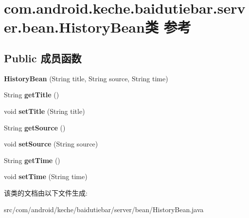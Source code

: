 \hypertarget{classcom_1_1android_1_1keche_1_1baidutiebar_1_1server_1_1bean_1_1_history_bean}{}\section{com.\+android.\+keche.\+baidutiebar.\+server.\+bean.\+History\+Bean类 参考}
\label{classcom_1_1android_1_1keche_1_1baidutiebar_1_1server_1_1bean_1_1_history_bean}
\subsection*{Public 成员函数}
\begin{DoxyCompactItemize}
\item 
\mbox{\label{classcom_1_1android_1_1keche_1_1baidutiebar_1_1server_1_1bean_1_1_history_bean_a3e26dd4e6369e2564de4675a1a8baa4d}} 
{\bfseries History\+Bean} (String title, String source, String time)
\item 
\mbox{\label{classcom_1_1android_1_1keche_1_1baidutiebar_1_1server_1_1bean_1_1_history_bean_a4c53786442e14dffef3c29269289b44f}} 
String {\bfseries get\+Title} ()
\item 
\mbox{\label{classcom_1_1android_1_1keche_1_1baidutiebar_1_1server_1_1bean_1_1_history_bean_a710912318668039881c80cdee9dd4b5c}} 
void {\bfseries set\+Title} (String title)
\item 
\mbox{\label{classcom_1_1android_1_1keche_1_1baidutiebar_1_1server_1_1bean_1_1_history_bean_ac2242c477e7b2a1946476b6f28000573}} 
String {\bfseries get\+Source} ()
\item 
\mbox{\label{classcom_1_1android_1_1keche_1_1baidutiebar_1_1server_1_1bean_1_1_history_bean_a4b6baf6a05fcfd81372e093ed460034f}} 
void {\bfseries set\+Source} (String source)
\item 
\mbox{\label{classcom_1_1android_1_1keche_1_1baidutiebar_1_1server_1_1bean_1_1_history_bean_aa0a5e52d86980c42ea85b3efd4f77b73}} 
String {\bfseries get\+Time} ()
\item 
\mbox{\label{classcom_1_1android_1_1keche_1_1baidutiebar_1_1server_1_1bean_1_1_history_bean_a61171edddb8ea4f00837415bdf187034}} 
void {\bfseries set\+Time} (String time)
\end{DoxyCompactItemize}


该类的文档由以下文件生成\+:\begin{DoxyCompactItemize}
\item 
src/com/android/keche/baidutiebar/server/bean/History\+Bean.\+java\end{DoxyCompactItemize}
